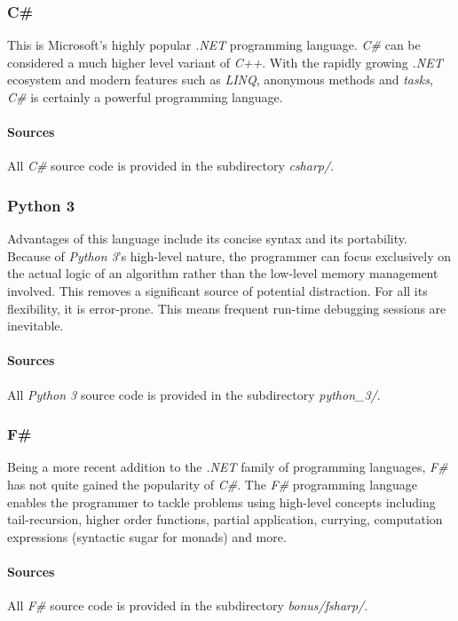 \documentclass{article}
\begin{document}
\subsubsection{C\#}
This is Microsoft's highly popular \cite{popularity-index} {\em .NET} programming language. {\em C\#} can be considered a much
higher level variant of {\em C++}. With the rapidly growing {\em .NET} ecosystem and modern features such as {\em LINQ},
anonymous methods and {\em tasks}, {\em C\#} is certainly a powerful programming language.

\paragraph{Sources}
All {\em C\#} source code is provided in the subdirectory {\em csharp/}.

\subsubsection{Python 3}
Advantages of this language include its concise syntax and its portability. Because of {\em Python 3}'s high-level nature,
the programmer can focus exclusively on the actual logic of an algorithm rather than the low-level memory management involved.
This removes a significant source of potential distraction. For all its flexibility, it is error-prone. This means frequent
run-time debugging sessions are inevitable.

\paragraph{Sources}
All {\em Python 3} source code is provided in the subdirectory {\em python\_3/}.

\subsubsection{F\#}
Being a more recent addition to the {\em .NET} family of programming languages, {\em F\#} has not quite gained the popularity of
{\em C\#}. The {\em F\#} programming language enables the programmer to tackle problems using high-level concepts including
tail-recursion, higher order functions, partial application, currying, computation expressions (syntactic sugar for monads) and
more.

\paragraph{Sources}
All {\em F\#} source code is provided in the subdirectory {\em bonus/fsharp/}.
\end{document}
